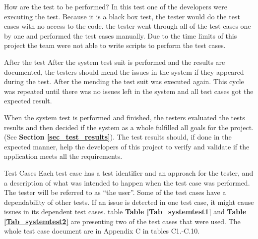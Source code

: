How are the test to be performed? \newline
In this test one of the developers were executing the test. Because it is a black box test, the tester would do the test cases with no access to the code. the tester went through all of the test cases one by one and performed the test cases manually. Due to the time limits of this project the team were not able to write scripts to perform the test cases. \newline

After the test\newline
After the system test suit is performed and the results are documented, the testers should mend the issues in the system if they appeared during the test. After the mending the test suit was executed again. This cycle was repeated until there was no issues left in the system and all test cases got the expected result.\newline

When the system test is performed and finished, the testers evaluated the tests results and then decided if the system as a whole fulfilled all goals for the project.(See \textbf{Section \ref{sec_test_results}}). The test results should, if done in the expected manner, help the developers of this project to verify and validate if the application meets all the requirements.\newline

Test Cases \newline
Each test case has a test identifier and an approach for the tester, and a description of what was intended to happen when the test case was performed. The tester will be referred to as “the user”. Some of the test cases have a dependability of other tests. If an issue is detected in one test case, it might cause issues in its dependent test cases. table \textbf{Table \ref{Tab_systemtest1}} and \textbf{Table \ref{Tab_systemtest2}} are presenting two of the test cases that were used. The whole test case document are in Appendix C in tables C1.-C.10. 

